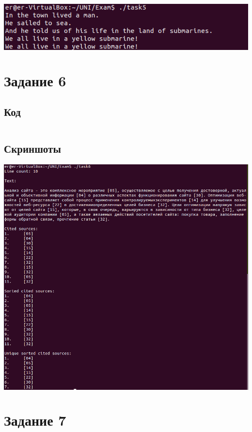 \documentclass{article}
\begin{document}
        \includegraphics[scale=0.5]{task5/task5.png}

\pagebreak

\section{Задание 6}

    \subsection{Код}

        \inputminted[frame=single, fontsize=\small]{cpp}{task6/task6.cpp}

    \subsection{Скриншоты}

        \includegraphics[scale=0.35]{task6/task6.png}

\pagebreak

\section{Задание 7}
\end{document}
